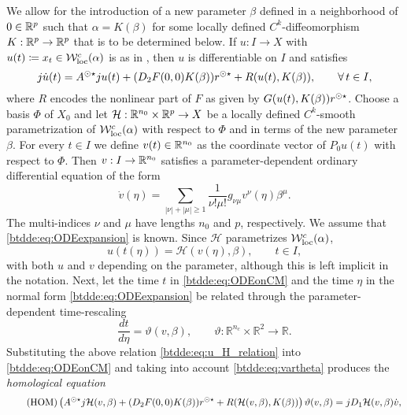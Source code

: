 We allow for the introduction of a new parameter $\beta$ defined in a
neighborhood of $0 \in \mathbb{R}^p$ such that $\alpha = K(\beta)$ for some locally
defined $C^k$-diffeomorphism $K : \mathbb{R}^p \to \mathbb{R}^p$ that is to be determined
below. If $u : I \to X$ with $u(t) \coloneqq x_t \in \mathcal{W}^c_{\text{loc}}(\alpha)$ is as in
\cite[Corollary 20]{Switching2019}, then $u$ is differentiable on $I$ and
satisfies
\begin{equation}
  \label{btdde:eq:ODEonCM}
  j\dot{u}(t) = A^{\odot\star}ju(t) + (D_2F(0,0)K(\beta))r^{\odot\star} 
    + R(u(t),K(\beta)), \qquad \forall\,t \in I,
\end{equation}
where $R$ encodes the nonlinear part of $F$ as given by $G(u(t),K(\beta))r^{\odot\star}$.
Choose a basis $\Phi$ of $X_0$ and let $\mathcal{H} : \mathbb{R}^{n_0} \times \mathbb{R}^p
\to X$ be a locally defined $C^k$-smooth parametrization of $\mathcal{W}^c_{\text{loc}}(\alpha)$ with
respect to $\Phi$ and in terms of the new parameter $\beta$. For every $t \in
I$ we define $v(t) \in \mathbb{R}^{n_0}$ as the coordinate vector of $P_0 u(t)$ with
respect to $\Phi$. Then $v : I \to \mathbb{R}^{n_0}$ satisfies a parameter-dependent
ordinary differential equation of the form
\begin{equation}
  \label{btdde:eq:ODEexpansion}
  \dot{v}(\eta) = \sum_{|\nu| + |\mu| \geq 1}\frac{1}{\nu!\mu!}g_{\nu\mu}v^{\nu}(\eta)\beta^{\mu}.
\end{equation}
The multi-indices $\nu$ and $\mu$ have lengths $n_0$ and $p$, respectively. We
assume that \cref{btdde:eq:ODEexpansion} is known. Since $\mathcal{H}$ parametrizes
$\mathcal{W}^c_{\text{loc}}(\alpha)$,
\begin{equation}
    \label{btdde:eq:u_H_relation}
    u(t(\eta)) = \mathcal{H}(v(\eta), \beta), \qquad t \in I,
\end{equation}
with both $u$ and $v$ depending on the parameter, although this is left
implicit in the notation. Next, let the time $t$ in \cref{btdde:eq:ODEonCM} and the
time $\eta$ in the normal form \cref{btdde:eq:ODEexpansion} be related through the
parameter-dependent time-rescaling
\begin{equation}
\label{btdde:eq:vartheta}
    \frac{dt}{d\eta} = \vartheta(v, \beta), \qquad 
        \vartheta\colon \mathbb R^{n_c} \times \mathbb R^2 \to \mathbb R.
\end{equation}
Substituting the above relation \cref{btdde:eq:u_H_relation} into \cref{btdde:eq:ODEonCM}
and taking into account \cref{btdde:eq:vartheta} produces the \emph{homological equation}
\begin{equation}
  \label{btdde:eq:homological_equation}
  \tag{HOM}
  \left ( A^{\odot\star}j\mathcal{H}(v,\beta) + (D_2F(0,0)K(\beta))r^{\odot\star} 
          + R(\mathcal{H}(v,\beta),K(\beta)) \right) \vartheta(v,\beta)
   = jD_1\mathcal{H}(v,\beta)\dot{v},
\end{equation}
